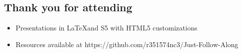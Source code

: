 \documentclass[12pt,notitlepage]{article}
\begin{document}
\begin{s5presentation}
%
%
  \W \begin{s5slide}
    \section{Thank you for attending }
    \begin{itemize}
      \item Presentations in \LaTeX and S5 with HTML5 customizations
      \item Resources available at https://github.com/r351574nc3/Just-Follow-Along
      \end{itemize}
    \W \end{s5slide}
  \W \end{s5presentation}
\end{document}
